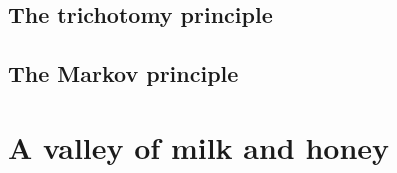 \documentclass[a4paper,10pt]{article}
\begin{document}
\subsection{The trichotomy principle}

\subsection{The Markov principle}

\section{A valley of milk and honey}

\end{document}

